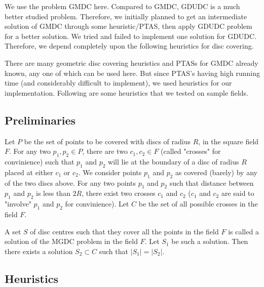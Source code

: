 We use the problem GMDC here. Compared to GMDC, GDUDC is a much better studied problem. Therefore, we initially planned to get an intermediate solution of GMDC through some heuristic/PTAS, then apply GDUDC problem for a better solution. We tried and failed to implement one solution \cite{carmi} for GDUDC. Therefore, we depend completely upon the following heuristics for disc covering.

There are many geometric disc covering heuristics and PTASs \cite{} for GMDC already known, any one of which can be used here. But since PTAS's having high running time \cite{hex} (and considerably difficult to implement), we used heuristics for our implementation. Following are some heuristics that we tested on sample fields.

\subsection{Preliminaries}
\label{subsec:prelim}

Let $P$ be the set of points to be covered with discs of radius $R$, in the square field $F$. For any two $p_1, p_2 \in P$, there are two $c_1,c_2 \in F$ (called "crosses" for convinience) such that $p_1$ and $p_2$ will lie at the boundary of a disc of radius $R$ placed at either $c_1$ or $c_2$. We consider points $p_1$ and $p_2$ as covered (barely) by any of the two discs above. For any two points $p_1$ and $p_2$ such that distance between $p_1$ and $p_2$ is less than $2R$, there exist two crosses $c_1$ and $c_2$ ($c_1$ and $c_2$ are said to "involve" $p_1$ and $p_2$ for convinience). Let $C$ be the set of all possible crosses in the field $F$.

A set $S$ of disc centres such that they cover all the points in the field $F$ is called a solution of the MGDC problem in the field $F$. Let $S_1$ be such a solution. Then there exists a solution $S_2 \subset C$ such that $|S_1|=|S_2|$.

\subsection{Heuristics}

